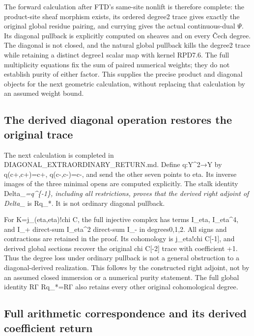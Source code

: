 The forward calculation after FTD's same-site nonlift is therefore
complete: the product-site sheaf morphism exists, its ordered degree2
trace gives exactly the original global residue pairing, and currying
gives the actual continuous-dual \(\Psi\). Its diagonal pullback is
explicitly computed on sheaves and on every Čech degree. The diagonal is
not closed, and the natural global pullback kills the degree2 trace
while retaining a distinct degree1 scalar map with kernel RPD7.6. The
full multiplicity equations fix the sum of paired numerical weights;
they do not establish purity of either factor. This supplies the precise
product and diagonal objects for the next geometric calculation, without
replacing that calculation by an assumed weight bound.

\subsection{The derived diagonal operation restores the original
trace}\label{the-derived-diagonal-operation-restores-the-original-trace-1}

The next calculation is completed in DIAGONAL\_EXTRAORDINARY\_RETURN.md.
Define q:Y\^{}2→Y by q(c+,c+)=c+, q(c-,c-)=c-, and send the other seven
points to eta. Its inverse images of the three minimal opens are
computed explicitly. The stalk identity Delta\_\emph{=q\^{}\{-1\},
including all restrictions, proves that the derived right adjoint of
Delta\_} is Rq\_*. It is not ordinary diagonal pullback.

For K=j\_(eta,eta)!chi C, the full injective complex has terms I\_eta,
I\_eta\^{}4, and I\_+ direct-sum I\_eta\^{}2 direct-sum I\_- in
degrees0,1,2. All signs and contractions are retained in the proof. Its
cohomology is j\_eta!chi C{[}-1{]}, and derived global sections recover
the original chi C{[}-2{]} trace with coefficient +1. Thus the degree
loss under ordinary pullback is not a general obstruction to a
diagonal-derived realization. This follows by the constructed right
adjoint, not by an assumed closed immersion or a numerical purity
statement. The full global identity RΓ Rq\_*=RΓ also retains every other
original cohomological degree.

\subsection{Full arithmetic correspondence and its derived coefficient
return}\label{full-arithmetic-correspondence-and-its-derived-coefficient-return-1}

